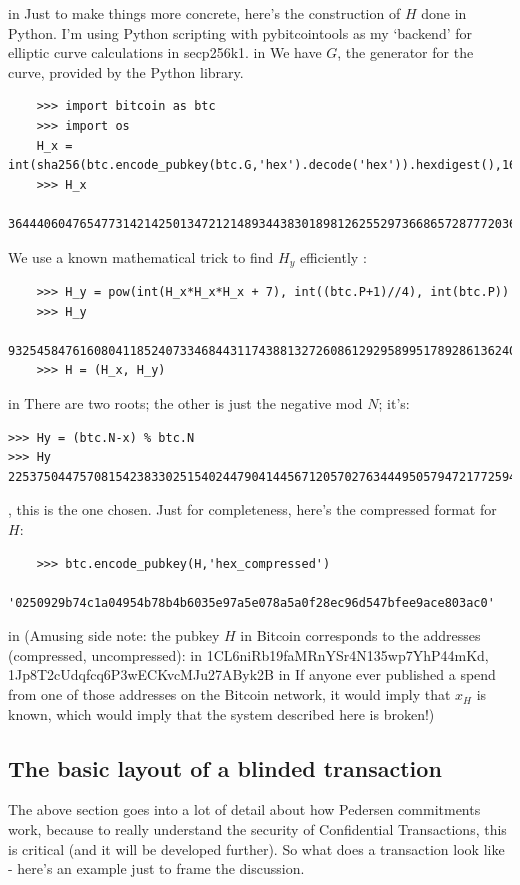 \documentclass[10pt,a4paper]{article}
\begin{document}
 in \noindent
Just to make things more concrete, here's the construction of $H$ done in Python. I'm using Python scripting with pybitcointools \cite{pbtc} as my `backend' for elliptic curve calculations in secp256k1.
 in \noindent We have $G$, the generator for the curve, provided by the Python library.
\begin{verbatim}
	>>> import bitcoin as btc
	>>> import os
	H_x = int(sha256(btc.encode_pubkey(btc.G,'hex').decode('hex')).hexdigest(),16)
	>>> H_x
	36444060476547731421425013472121489344383018981262552973668657287772036414144L
\end{verbatim}

We use a known mathematical trick to find $H_y$ efficiently \cite{residue}:
\begin{verbatim}
	>>> H_y = pow(int(H_x*H_x*H_x + 7), int((btc.P+1)//4), int(btc.P))
	>>> H_y
	93254584761608041185240733468443117438813272608612929589951789286136240436011L
	>>> H = (H_x, H_y)
\end{verbatim}

 in \noindent There are two roots; the other is just the negative mod $N$; it's:
\begin{verbatim}
>>> Hy = (btc.N-x) % btc.N
>>> Hy
22537504475708154238330251540244790414456712057027634449505794721772594235652L
\end{verbatim}
, this is the one chosen. Just for completeness, here's the compressed format for $H$:
\begin{verbatim}
	>>> btc.encode_pubkey(H,'hex_compressed')
	'0250929b74c1a04954b78b4b6035e97a5e078a5a0f28ec96d547bfee9ace803ac0'
\end{verbatim}

 in \noindent (Amusing side note: the pubkey $H$ in Bitcoin corresponds to the addresses (compressed, uncompressed):
 in \noindent 1CL6niRb19faMRnYSr4N135wp7YhP44mKd, 1Jp8T2cUdqfcq6P3wECKvcMJu27AByk2B
 in \noindent If anyone ever published a spend from one of those addresses on the Bitcoin network, it would imply that $x_H$ is known, which would imply that the system described here is broken!)

\subsection{The basic layout of a blinded transaction}

The above section goes into a lot of detail about how Pedersen commitments work, because to really understand the security of Confidential Transactions, this is critical (and it will be developed further). So what does a transaction look like - here's an example just to frame the discussion.
\end{document}
